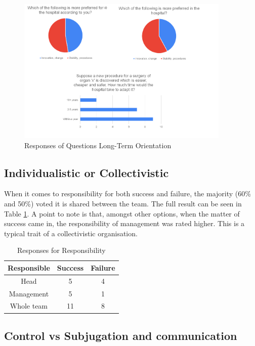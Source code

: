 \documentclass{article}
\begin{document}
\begin{figure}
    \begin{center}
        \includegraphics[width = 4in]{Time.png}
    \end{center}
    \caption{Responses of Questions Long-Term Orientation}
    \label{Time}
\end{figure}

\subsection{Individualistic or Collectivistic}

When it comes to responsibility for both success and failure, the majority (60\% and 50\%) voted it is shared between the team. The full result can be seen in Table \ref{responsible}. A point to note is that, amongst other options, when the matter of success came in, the responsibility of management was rated higher. This is a typical trait of a collectivistic organisation.

\begin{table}
    \begin{center}
        \begin{tabular}{|c|c|c|}
            \hline
            Responsible & Success & Failure \\
            \hline
            Head & 5 & 4\\
            Management & 5 & 1\\
            Whole team & 11 & 8\\
            \hline
        \end{tabular}
        \caption{Responses for Responsibility}
        \label{responsible}
    \end{center}
\end{table}

\subsection{Control vs Subjugation and communication}
\end{document}
